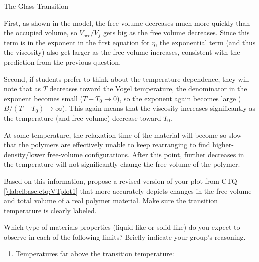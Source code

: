 \begin{activity}{The Glass Transition}
\begin{ctqs}
\begin{solution}[2in]
					First, as shown in the model, the free volume decreases much more quickly than the occupied volume, so $V_{occ}/V_f$ gets big as the free volume decreases.  Since this term is in the exponent in the first equation for $\eta$, the exponential term (and thus the viscosity) also get larger as the free volume increases, consistent with the prediction from the previous question.
					
					Second, if students prefer to think about the temperature dependence, they will note that as $T$ decreases toward the Vogel temperature, the denominator in the exponent becomes small ($T-T_0\to 0$), so the exponent again becomes large ($B/(T-T_0) \to \infty$).  This again means that the viscosity increases significantly as the temperature (and free volume) decrease toward $T_0$.
				\end{solution}
	
	\clearpage
	\question At some temperature, the relaxation time of the material will become so slow that the polymers are effectively unable to keep rearranging to find higher-density/lower free-volume configurations.  After this point, further decreases in the temperature will not significantly change the free volume of the polymer. \label{\labelbase:ctq:traptemp}
	
		Based on this information, propose a revised version of your plot from CTQ \ref{\labelbase:ctq:VTplot1} that more accurately depicts changes in the free volume and total volume of a real polymer material.  Make sure the transition temperature is clearly labeled.
	
		\vspace{0.25in}
	
		\begin{solution}[1.5in]\end{solution}
		
	\question Which type of materials properties (liquid-like or solid-like) do you expect to observe in each of the following limits?  Briefly indicate your group's reasoning. \label{\labelbase:ctq:properties}
	
		\begin{enumerate}
			\item Temperatures far above the transition temperature:
			

\end{enumerate}
\end{ctqs}
\end{activity}
